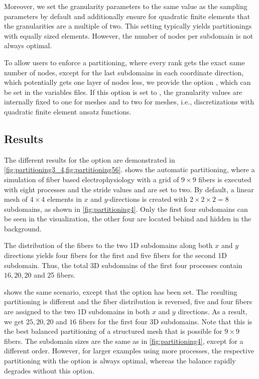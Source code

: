 Moreover, we set the granularity parameters to the same value as the sampling parameters by default and additionally ensure  for quadratic finite elements that the granularities are a multiple of two. This setting typically yields partitionings with equally sized elements. However, the number of nodes per subdomain is not always optimal.

To allow users to enforce a partitioning, where every rank gets the exact same number of nodes, except for the last subdomains in each coordinate direction, which potentially gets one layer of nodes less, we provide the option , which can be set in the variables files. If this option is set to , the granularity values are internally fixed to one for  meshes and to two for  meshes, i.e., discretizations with quadratic finite element ansatz functions.

\subsection{Results}\label{sec:partitioning_results}

The different results for the  option are demonstrated in \cref{fig:partitioning3_4,fig:partitioning56}.  shows the automatic partitioning, where a simulation of fiber based electrophysiology with a grid of $9 \times 9$ fibers is executed with eight processes and the stride values  and  are set to two.
By default, a linear mesh of $4\times 4$ elements in $x$ and $y$-directions is created with $2\times 2 \times 2=8$ subdomains, as shown in \cref{fig:partitioning4}. Only the first four subdomains can be seen in the visualization, the other four are located behind and hidden in the background.

The distribution of the fibers to the two 1D subdomains along both $x$ and $y$ directions yields four fibers for the first and five fibers for the second 1D subdomain. Thus, the total 3D subdomains of the first four processes contain $16,20,20$ and 25 fibers.

 shows the same scenario, except that the option  has been set. The resulting partitioning is different and the fiber distribution is reversed, five and four fibers are assigned to the two 1D subdomains in both $x$ and $y$ directions. As a result, we get $25,20,20$ and $16$ fibers for the first four 3D subdomains. Note that this is the best balanced partitioning of a structured mesh that is possible for $9 \times 9$ fibers.
The subdomain sizes are the same as in \cref{fig:partitioning4}, except for a different order. However, for larger examples using more processes, the respective partitioning with the  option is always optimal, whereas the balance rapidly degrades without this option.

